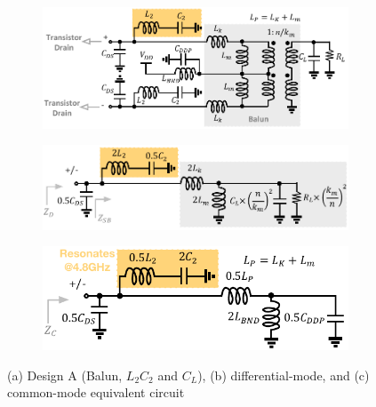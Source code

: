\documentclass[conference]{IEEEtran}
\begin{document}
\begin{figure}[!t]
\captionsetup{font=footnotesize}
\centering
\begin{subfigure}{0.5\textwidth}
\centering
\includegraphics[width=1\textwidth]{Images/Design/Design_A_FC.pdf}
\caption{}
\label{fig:Design_A_FC}
\end{subfigure}
\begin{subfigure}[b]{0.3\textwidth}
\includegraphics[width=1.1\textwidth]{Images/Design/Design_A_Diff.pdf}
\caption{}
\label{fig:Design_A_Diff}
\end{subfigure}
\begin{subfigure}[b]{0.24\textwidth}
\includegraphics[width=1.2\textwidth]{Images/Design/Design_A_Com.pdf}
\caption{}
\label{fig:Design_A_Com}
\end{subfigure}
\caption{(a) Design A (Balun, $L_2C_2$ and $C_L$), (b) differential-mode, and (c) common-mode equivalent circuit }
\label{fig:Design_A}
\vspace{-0.2in}
\end{figure}
\end{document}
